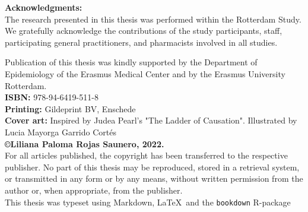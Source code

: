 \thispagestyle{empty}
\vspace*{\fill}
\small

\textbf{Acknowledgments:} \\

The research presented in this thesis was performed within the Rotterdam Study. We gratefully acknowledge the contributions of the study participants, staff, participating general practitioners, and pharmacists involved in all studies.

Publication of this thesis was kindly supported by the Department of Epidemiology of the Erasmus Medical Center and by the Erasmus University Rotterdam. \\


\textbf{ISBN:} 978-94-6419-511-8\\
\textbf{Printing:} Gildeprint BV, Enschede\\  
\textbf{Cover art:} Inspired by Judea Pearl's 
"The Ladder of Causation". Illustrated by Lucia Mayorga Garrido Cortés \\

\textbf{\copyright Liliana Paloma Rojas Saunero, 2022.} \\

For all articles published, the copyright has been transferred to the respective publisher. No part of this thesis may be reproduced, stored in a retrieval system, or transmitted in any form or by any means, without written permission from the author or, when appropriate, from the publisher. \\

This thesis was typeset using Markdown, \LaTeX\ and the \verb+bookdown+ R-package


